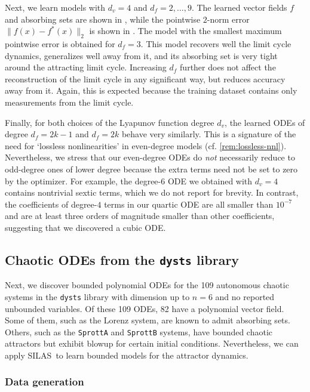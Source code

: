 \documentclass[11pt]{amsart}
\numberwithin{equation}{section}
\theoremstyle{plain}
\theoremstyle{definition}
\theoremstyle{remark}
\renewcommand{\vec}[1]{{#1}}
\newcommand{\methodname}{{SILAS}}
\begin{document}
Next, we learn models with $d_v=4$ and $d_f=2,\dots,9$. The learned vector fields $f$ and absorbing sets are shown in , while the pointwise $2$-norm error $\|\vec{f}(x) - \vec{f}^*(x)\|_{2}$ is shown in . The model with the smallest maximum pointwise error is obtained for $d_f=3$. This model recovers well the limit cycle dynamics, generalizes well away from it, and its absorbing set is very tight around the attracting limit cycle. Increasing $d_f$ further does not affect the reconstruction of the limit cycle in any significant way, but reduces accuracy away from it. Again, this is expected because the training dataset contains only measurements from the limit cycle.

Finally, for both choices of the Lyapunov function degree $d_v$, the learned ODEs of degree $d_f=2k-1$ and $d_f=2k$ behave very similarly. This is a signature of the need for `lossless nonlinearities' in even-degree models (cf. \cref{rem:lossless-nnl}). Nevertheless, we stress that our even-degree ODEs do \emph{not} necessarily reduce to odd-degree ones of lower degree because the extra terms need not be set to zero by the optimizer. For example, the degree-$6$ ODE we obtained with $d_v=4$ contains nontrivial sextic terms, which we do not report for brevity. In contrast, the coefficients of degree-$4$ terms in our quartic ODE are all smaller than $10^{-7}$ and are at least three orders of magnitude smaller than other coefficients, suggesting that we discovered a cubic ODE.


\subsection{Chaotic ODEs from the \texttt{dysts} library}

Next, we discover bounded polynomial ODEs for the 109 autonomous chaotic systems in the \texttt{dysts} library \cite{gilpin2021chaos} with dimension up to $n = 6$ and no reported unbounded variables. Of these 109 ODEs, 82 have a polynomial vector field. Some of them, such as the Lorenz system, are known to admit absorbing sets. Others, such as the \texttt{SprottA} and \texttt{SprottB} systems, have bounded chaotic attractors but exhibit blowup for certain initial conditions. Nevertheless, we can apply \methodname\ to learn bounded models for the attractor dynamics. 

\subsubsection{Data generation}
\end{document}
